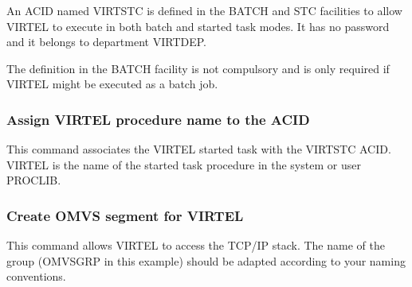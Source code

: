 \documentclass[letterpaper,10pt,english]{sphinxmanual}
\begin{document}

An ACID named VIRTSTC is defined in the BATCH and STC facilities to allow VIRTEL to execute in both batch and started task modes. It has no password and it belongs to department VIRTDEP.

The definition in the BATCH facility is not compulsory and is only required if VIRTEL might be executed as a batch job.


\subsubsection{Assign VIRTEL procedure name to the ACID}
\label{\detokenize{Installation_Guide:assign-virtel-procedure-name-to-the-acid}}
\begin{sphinxVerbatim}[commandchars=\\\{\}]
   
\end{sphinxVerbatim}


This command associates the VIRTEL started task with the VIRTSTC ACID. VIRTEL is the name of the started task procedure in the system or user PROCLIB.


\subsubsection{Create OMVS segment for VIRTEL}
\label{\detokenize{Installation_Guide:id11}}
\begin{sphinxVerbatim}[commandchars=\\\{\}]
     
         
\end{sphinxVerbatim}


This command allows VIRTEL to access the TCP/IP stack. The name of the group (OMVSGRP in this example) should be adapted according to your naming conventions.
\end{document}
